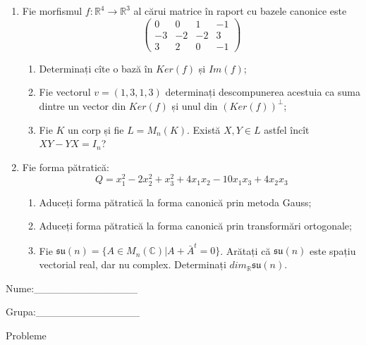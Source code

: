 \documentclass{article}
\begin{document}
\begin{enumerate}
 \item Fie morfismul $f:\mathbb{R}^4 \to \mathbb{R}^3$ al cărui matrice în raport cu bazele canonice este
$$\begin{pmatrix}
0&0&1&-1\\
-3&-2&-2&3\\
3&2&0&-1
\end{pmatrix}$$

\begin{enumerate}
\item Determinați cîte o bază în $Ker(f)$ și $Im(f)$;
\item Fie vectorul $v=(1,3,1,3)$ determinați descompunerea acestuia ca suma dintre un vector din $Ker(f)$ și unul din $(Ker(f))^\perp$;
\item Fie $K$ un corp și fie $L=M_n(K)$. Există $X,Y \in L$ astfel încît $XY-YX=I_n$?  
\end{enumerate}
\item Fie forma pătratică:
$$Q= x_1^2-2x_2^2+x_3^2+4x_1x_2-10x_1x_3+4x_2x_3$$

\begin{enumerate}
\item Aduceți forma pătratică la forma canonică prin metoda Gauss;
\item Aduceți forma pătratică la forma canonică prin transformări ortogonale;
\item Fie $\mathfrak{su}(n)=\{ A \in M_n(\mathbb{C}) | A+\bar{A}^t=0\}$. Arătați că $\mathfrak{su}(n)$ este spațiu vectorial real, dar nu complex.
Determinați $dim_{\mathbb{R}}\mathfrak{su}(n)$.
\end{enumerate}
\end{enumerate}
\newpage
\begin{flushright}
Nume:\_\_\_\_\_\_\_\_\_\_\_\_\_\_
 
 
Grupa:\_\_\_\_\_\_\_\_\_\_\_\_\_\_
\end{flushright}
\begin{center}
\vspace{2cm}
{\Large Probleme}
\vspace{2cm}
\end{center}
\end{document}
